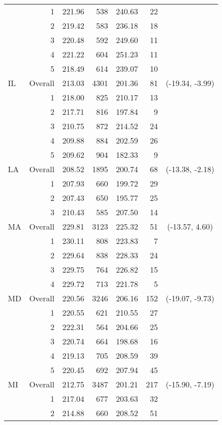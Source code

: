 \begin{longtable}{lrrr@{\extracolsep{.25cm}}rrc}
   & 1 & 221.96 & 538 & 240.63 &  22 &  \\ 
   & 2 & 219.42 & 583 & 236.18 &  18 &  \\ 
   & 3 & 220.48 & 592 & 249.60 &  11 &  \\ 
   & 4 & 221.22 & 604 & 251.23 &  11 &  \\ 
   & 5 & 218.49 & 614 & 239.07 &  10 &  \\ 
   \hline
IL & Overall & 213.03 & 4301 & 201.36 &  81 & (-19.34,  -3.99) \\ 
   & 1 & 218.00 & 825 & 210.17 &  13 &  \\ 
   & 2 & 217.71 & 816 & 197.84 &   9 &  \\ 
   & 3 & 210.75 & 872 & 214.52 &  24 &  \\ 
   & 4 & 209.88 & 884 & 202.59 &  26 &  \\ 
   & 5 & 209.62 & 904 & 182.33 &   9 &  \\ 
   \hline
LA & Overall & 208.52 & 1895 & 200.74 &  68 & (-13.38,  -2.18) \\ 
   & 1 & 207.93 & 660 & 199.72 &  29 &  \\ 
   & 2 & 207.43 & 650 & 195.77 &  25 &  \\ 
   & 3 & 210.43 & 585 & 207.50 &  14 &  \\ 
   \hline
MA & Overall & 229.81 & 3123 & 225.32 &  51 & (-13.57,   4.60) \\ 
   & 1 & 230.11 & 808 & 223.83 &   7 &  \\ 
   & 2 & 229.64 & 838 & 228.33 &  24 &  \\ 
   & 3 & 229.75 & 764 & 226.82 &  15 &  \\ 
   & 4 & 229.72 & 713 & 221.78 &   5 &  \\ 
   \hline
MD & Overall & 220.56 & 3246 & 206.16 & 152 & (-19.07,  -9.73) \\ 
   & 1 & 220.55 & 621 & 210.55 &  27 &  \\ 
   & 2 & 222.31 & 564 & 204.66 &  25 &  \\ 
   & 3 & 220.74 & 664 & 198.68 &  16 &  \\ 
   & 4 & 219.13 & 705 & 208.59 &  39 &  \\ 
   & 5 & 220.45 & 692 & 207.94 &  45 &  \\ 
   \hline
MI & Overall & 212.75 & 3487 & 201.21 & 217 & (-15.90,  -7.19) \\ 
   & 1 & 217.04 & 677 & 203.63 &  32 &  \\ 
   & 2 & 214.88 & 660 & 208.52 &  51 &  \\ 

\end{longtable}
